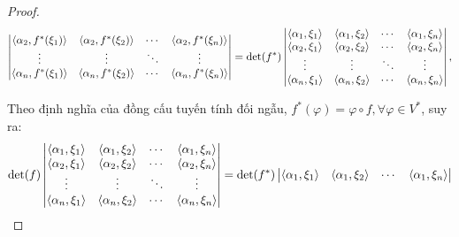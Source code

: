 \documentclass[class=nhvh-linear-algebra,crop=false]{standalone}
\begin{document}
\begin{proof}
\begin{align*}
\begin{vmatrix}
            \left\langle{\alpha_{2},f^{*}(\xi_{1})}\right\rangle & \left\langle{\alpha_{2},f^{*}(\xi_{2})}\right\rangle & \cdots & \left\langle{\alpha_{2},f^{*}(\xi_{n})}\right\rangle \\
            \vdots                              & \vdots                              & \ddots & \vdots                              \\
            \left\langle{\alpha_{n},f^{*}(\xi_{1})}\right\rangle & \left\langle{\alpha_{n},f^{*}(\xi_{2})}\right\rangle & \cdots & \left\langle{\alpha_{n},f^{*}(\xi_{n})}\right\rangle \\
        \end{vmatrix}
         & = \det(f^{*})
        \begin{vmatrix}
            \left\langle{\alpha_{1},\xi_{1}}\right\rangle & \left\langle{\alpha_{1},\xi_{2}}\right\rangle & \cdots & \left\langle{\alpha_{1},\xi_{n}}\right\rangle \\
            \left\langle{\alpha_{2},\xi_{1}}\right\rangle & \left\langle{\alpha_{2},\xi_{2}}\right\rangle & \cdots & \left\langle{\alpha_{2},\xi_{n}}\right\rangle \\
            \vdots                       & \vdots                       & \ddots & \vdots                       \\
            \left\langle{\alpha_{n},\xi_{1}}\right\rangle & \left\langle{\alpha_{n},\xi_{2}}\right\rangle & \cdots & \left\langle{\alpha_{n},\xi_{n}}\right\rangle \\
        \end{vmatrix}, \\
    \end{align*}
    \par Theo định nghĩa của đồng cấu tuyến tính đối ngẫu, $f^{*}(\varphi) = \varphi\circ f, \forall\varphi\in V^{*}$, suy ra:
    \[
        \det(f)
        \begin{vmatrix}
            \left\langle{\alpha_{1},\xi_{1}}\right\rangle & \left\langle{\alpha_{1},\xi_{2}}\right\rangle & \cdots & \left\langle{\alpha_{1},\xi_{n}}\right\rangle \\
            \left\langle{\alpha_{2},\xi_{1}}\right\rangle & \left\langle{\alpha_{2},\xi_{2}}\right\rangle & \cdots & \left\langle{\alpha_{2},\xi_{n}}\right\rangle \\
            \vdots                       & \vdots                       & \ddots & \vdots                       \\
            \left\langle{\alpha_{n},\xi_{1}}\right\rangle & \left\langle{\alpha_{n},\xi_{2}}\right\rangle & \cdots & \left\langle{\alpha_{n},\xi_{n}}\right\rangle \\
        \end{vmatrix}
        =
        \det(f^{*})
        \begin{vmatrix}
            \left\langle{\alpha_{1},\xi_{1}}\right\rangle & \left\langle{\alpha_{1},\xi_{2}}\right\rangle & \cdots & \left\langle{\alpha_{1},\xi_{n}}\right\rangle \\

\end{vmatrix}\]
\end{proof}
\end{document}
